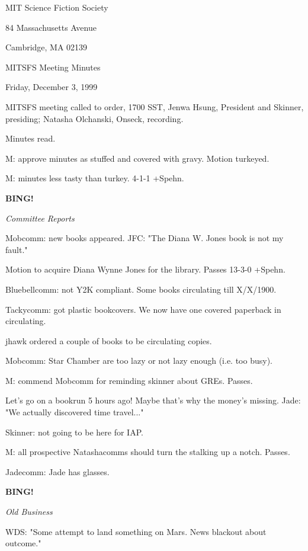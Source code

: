 \documentclass[12pt]{article}
\newcommand{\bing}{{\bf BING!} }
\newcommand{\goto}[1]{\bing \vskip 12pt \centerline{{\em{#1}}}}
\begin{document}
\begin{center}

MIT Science Fiction Society 

84 Massachusetts Avenue

Cambridge, MA 02139

\vspace{12pt}

MITSFS Meeting Minutes 

Friday, December 3, 1999

\end{center}
 
\vspace{18pt}

\setlength{\parskip}{6pt}

\noindent
MITSFS meeting called to order, 1700 SST,
Jenwa Hsung, President and Skinner, presiding; Natasha Olchanski, Onseck, recording.

Minutes read.

M: approve minutes as stuffed and covered with gravy. Motion turkeyed.

M: minutes less tasty than turkey. 4-1-1 +Spehn.

\goto{Committee Reports}

Mobcomm: new books appeared. JFC: "The Diana W. Jones book is not my fault."

Motion to acquire Diana Wynne Jones for the library. Passes 13-3-0 +Spehn.

Bluebellcomm: not Y2K compliant. Some books circulating till X/X/1900.

Tackycomm: got plastic bookcovers. We now have one covered paperback in circulating.

jhawk ordered a couple of books to be circulating copies.

Mobcomm: Star Chamber are too lazy or not lazy enough (i.e. too busy).

M: commend Mobcomm for reminding skinner about GREs. Passes.

Let's go on a bookrun 5 hours ago! Maybe that's why the money's missing. Jade: "We actually discovered time travel..."

Skinner: not going to be here for IAP.

M: all prospective Natashacomms should turn the stalking up a notch. Passes.

Jadecomm: Jade has glasses.

\goto{Old Business}

WDS: "Some attempt to land something on Mars. News blackout about outcome."
\end{document}
